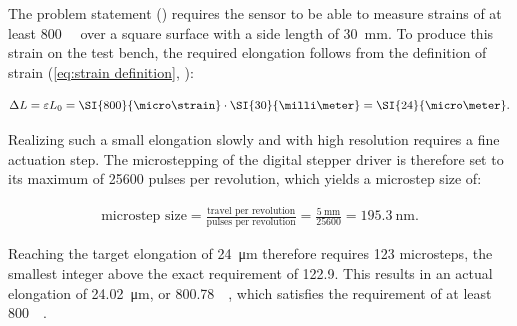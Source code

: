 The problem statement () requires the sensor to be able to measure strains of at least \SI{800}{\micro\strain} over a square surface with a side length of \SI{30}{\milli\meter}. To produce this strain on the test bench, the required elongation follows from the definition of strain (\cref{eq:strain definition}, ):

\begin{align}\label{eq:microStrain}
    \Delta L = \varepsilon L_{0} = \SI{800}{\micro\strain} \cdot \SI{30}{\milli\meter} = \SI{24}{\micro\meter}.
\end{align}

Realizing such a small elongation slowly and with high resolution requires a fine actuation step. The microstepping of the digital stepper driver is therefore set to its maximum of \num{25600} pulses per revolution, which yields a microstep size of:

\begin{align} \label{eq:microstep}
    \text{microstep size} = \frac{\text{travel per revolution}}{\text{pulses per revolution}} = \frac{\SI{5}{\milli\meter}}{\num{25600}} = \SI{195.3}{\nano\meter}.
\end{align}

Reaching the target elongation of \SI{24}{\micro\meter} therefore requires \num{123} microsteps, the smallest integer above the exact requirement of \num{122.9}. This results in an actual elongation of \SI{24.02}{\micro\meter}, or \SI{800.78}{\micro\strain}, which satisfies the requirement of at least \SI{800}{\micro\strain}.